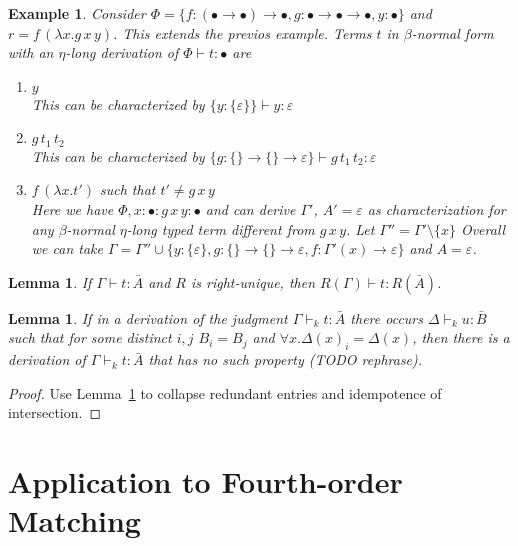 \documentclass[10pt,a4paper]{article}
\theoremstyle{plain}%
\newtheorem{lemma}[theorem]{Lemma}
\newtheorem{example}[theorem]{Example}
\begin{document}
\begin{example}
Consider $\Phi = \{f : (\bullet \to \bullet) \to \bullet, g : \bullet \to \bullet \to \bullet, y : \bullet\}$ and $r = f\,(\lambda x.g\,x\,y)$.
This extends the previos example.
Terms $t$ in $\beta$-normal form with an $\eta$-long derivation of $\Phi \vdash t : \bullet$ are
\begin{enumerate}
\item $y$\\
This can be characterized by $\{y : \{\varepsilon\}\} \vdash y : \varepsilon$
\item $g\,t_1\,t_2$\\
This can be characterized by $\{g : \{\} \to \{\} \to \varepsilon \} \vdash g\,t_1\,t_2 : \varepsilon$
\item $f\,(\lambda x.t')$ such that $t' \neq g\,x\,y$\\
Here we have $\Phi, x : \bullet : g\,x\,y : \bullet$ and can derive $\Gamma'$, $A' = \varepsilon$ as characterization for any $\beta$-normal $\eta$-long typed term different from $g\,x\,y$.
Let $\Gamma'' = \Gamma' \setminus \{x\}$
Overall we can take $\Gamma = \Gamma'' \cup \{y : \{\varepsilon\}, g : \{\} \to \{\} \to \varepsilon, f : \Gamma'(x) \to \varepsilon\}$ and $A = \varepsilon$.
\end{enumerate}
\end{example}

\begin{lemma}
\label{lem:transform}
If $\Gamma \vdash t : \bar{A}$ and $R$ is right-unique, then $R(\Gamma) \vdash t : R(\bar{A})$.
\end{lemma}

\begin{lemma}
If in a derivation of the judgment $\Gamma \vdash_k t : \bar{A}$ there occurs $\Delta \vdash_k u : \bar{B}$ such that for some distinct $i, j$
$B_i = B_j$ and $\forall x.\Delta(x)_i = \Delta(x)$, then there is a derivation of $\Gamma \vdash_k t : \bar{A}$ that has no such property (TODO rephrase).
\end{lemma}

\begin{proof}
Use Lemma~\ref{lem:transform} to collapse redundant entries and idempotence of intersection.
\end{proof}

\newpage

\section{Application to Fourth-order Matching}
\end{document}
